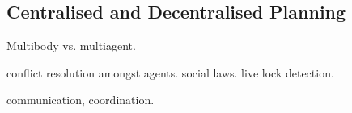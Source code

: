\subsection{Centralised and Decentralised Planning}

Multibody vs. multiagent.

conflict resolution amongst agents.
social laws.
live lock detection.

communication, coordination.
